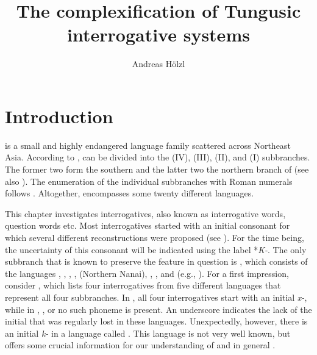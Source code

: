 \documentclass[output=paper,hidelinks]{langscibook}
\title{The complexification of Tungusic interrogative systems}
\author{Andreas Hölzl\affiliation{University of Potsdam}}
\begin{document}
\maketitle

\section{Introduction}\label{sec1}

 is a small and highly endangered language family scattered across Northeast Asia. According to \citet{Janhunen2012},  can be divided into the  (IV),  (III),  (II), and  (I) subbranches. The former two form the southern and the latter two the northern branch of  (see also \citealt{Georg2004}). The enumeration of the individual subbranches with Roman numerals follows \citet{Ikegami1974}. Altogether,  encompasses some twenty different languages.

This chapter investigates  interrogatives, also known as interrogative words, question words etc. Most  interrogatives started with an initial consonant for which several different reconstructions were proposed (see \citealt{Rozycki1993}). For the time being, the uncertainty of this consonant will be indicated using the label *\textit{K-}. The only subbranch that is known to preserve the feature in question is , which consists of the languages , , , ,  (Northern Nanai), , , and  (e.g., \citealt{Schmidt1923, Schmidt1928, Alonso2011, Janhunen2012}). For a first impression, consider , which lists four interrogatives from five different languages that represent all four  subbranches.
In , all four interrogatives start with an initial \textit{x-}, while in , , or  no such phoneme is present. An underscore indicates the lack of the initial that was regularly lost in these languages. Unexpectedly, however, there is an initial \textit{k-} in a language called . This language is not very well known, but offers some crucial information for our understanding of  and  in general \citep{Hölzl2017}.
\end{document}
